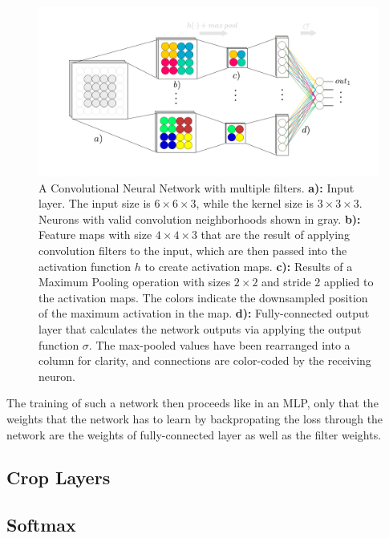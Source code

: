 \begin {figure}[!ht]
	\begin{center}
		\includegraphics[scale=0.75]{img/fig_convnet}
	\end{center}
	\caption{A Convolutional Neural Network with multiple filters. \textbf{a):} Input layer. The input size is $6 \times 6 \times 3$, while the kernel size is $3 \times 3 \times 3$. Neurons with valid convolution neighborhoods shown in gray. \textbf{b):} Feature maps with size $4 \times 4 \times 3$ that are the result of applying convolution filters to the input, which are then passed into the activation function $h$ to create activation maps. \textbf{c):} Results of a Maximum Pooling operation with sizes $2 \times 2$ and stride $2$ applied to the activation maps. The colors indicate the downsampled position of the maximum activation in the map. \textbf{d):} Fully-connected output layer that calculates the network outputs via applying the output function $\sigma$. The max-pooled values have been rearranged into a column for clarity, and connections are color-coded by the receiving neuron.}
	\label{fig:convnet}
\end {figure}

\noindent The training of such a network then proceeds like in an MLP, only that the weights that the network has to learn by backpropating the loss through the network are the weights of fully-connected layer as well as the filter weights. \cite{deeplearning_book}

		\subsection {Crop Layers}
		\subsection{Softmax}

